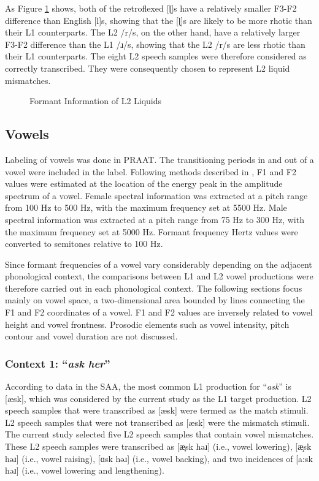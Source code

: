 As Figure \ref{fig:l2_liquid} shows, both of the retroflexed [ɭ]s have a relatively smaller F3-F2 difference than English [l]s, showing that the [ɭ]s are likely to be more rhotic than their L1 counterparts. The L2 /r/s, on the other hand, have a relatively larger F3-F2 difference than the L1 /ɹ/s, showing that the L2 /r/s are less rhotic than their L1 counterparts. The eight L2 speech samples were therefore considered as correctly transcribed. They were consequently chosen to represent L2 liquid mismatches.

\begin{figure}[h]
  \figSpace
    \centering
            
    \caption{Formant Information of L2 Liquids}
    \label{fig:l2_liquid}
  \figSpace
\end{figure}

\subsection{Vowels}

Labeling of vowels was done in PRAAT. The transitioning periods in and out of a vowel were included in the label. Following methods described in \citet{De_Jong_2009}, F1 and F2 values were estimated at the location of the energy peak in the amplitude spectrum of a vowel. Female spectral information was extracted at a pitch range from 100 Hz to 500 Hz, with the maximum frequency set at 5500 Hz. Male spectral information was extracted at a pitch range from 75 Hz to 300 Hz, with the maximum frequency set at 5000 Hz. Formant frequency Hertz values were converted to semitones relative to 100 Hz. 

Since formant frequencies of a vowel vary considerably depending on the adjacent phonological context, the comparisons between L1 and L2 vowel productions were therefore carried out in each phonological context. The following sections focus mainly on vowel space, a two-dimensional area bounded by lines connecting the F1 and F2 coordinates of a vowel. F1 and F2 values are inversely related to vowel height and vowel frontness. Prosodic elements such as vowel intensity, pitch contour and vowel duration are not discussed. 

\subsubsection{Context 1: “\textit{ask her}”}

According to data in the SAA, the most common L1 production for “\textit{ask}” is [æsk], which was considered by the current study as the L1 target production. L2 speech samples that were transcribed as [æsk] were termed as the match stimuli. L2 speech samples that were not transcribed as [æsk] were the mismatch stimuli. The current study selected five L2 speech samples that contain vowel mismatches. These L2 speech samples were transcribed as [æ̞sk həɹ] (i.e., vowel lowering), [æ̝sk  həɹ] (i.e., vowel raising), [ɑsk həɹ] (i.e., vowel backing), and two incidences of [a:sk həɹ] (i.e., vowel lowering and lengthening).

